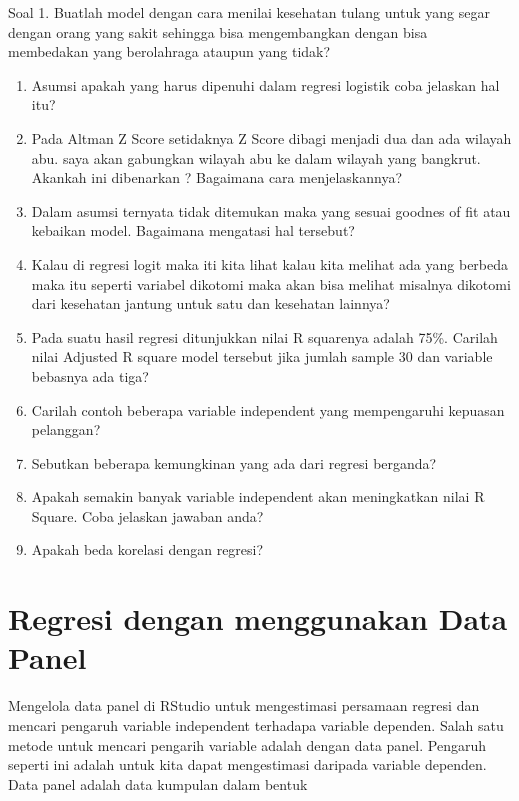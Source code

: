 \documentclass[
]{book}
\theoremstyle{definition}
\theoremstyle{definition}
\theoremstyle{definition}
\theoremstyle{definition}
\theoremstyle{remark}
\begin{document}
Soal
1. Buatlah model dengan cara menilai kesehatan tulang untuk yang segar dengan orang yang sakit sehingga bisa mengembangkan dengan bisa membedakan yang berolahraga ataupun yang tidak?

\begin{enumerate}
\def\labelenumi{\arabic{enumi}.}
\setcounter{enumi}{1}
\item
  Asumsi apakah yang harus dipenuhi dalam regresi logistik coba jelaskan hal itu?
\item
  Pada Altman Z Score setidaknya Z Score dibagi menjadi dua dan ada wilayah abu. saya akan gabungkan wilayah abu ke dalam wilayah yang bangkrut. Akankah ini dibenarkan ? Bagaimana cara menjelaskannya?
\item
  Dalam asumsi ternyata tidak ditemukan maka yang sesuai goodnes of fit atau kebaikan model. Bagaimana mengatasi hal tersebut?
\item
  Kalau di regresi logit maka iti kita lihat kalau kita melihat ada yang berbeda maka itu seperti variabel dikotomi maka akan bisa melihat misalnya dikotomi dari kesehatan jantung untuk satu dan kesehatan lainnya?
\item
  Pada suatu hasil regresi ditunjukkan nilai R squarenya adalah 75\%. Carilah nilai Adjusted R square model tersebut jika jumlah sample 30 dan variable bebasnya ada tiga?
\item
  Carilah contoh beberapa variable independent yang mempengaruhi kepuasan pelanggan?
\item
  Sebutkan beberapa kemungkinan yang ada dari regresi berganda?
\item
  Apakah semakin banyak variable independent akan meningkatkan nilai R Square. Coba jelaskan jawaban anda?
\item
  Apakah beda korelasi dengan regresi?
\end{enumerate}

\hypertarget{regresi-dengan-menggunakan-data-panel}{%
\section{Regresi dengan menggunakan Data Panel}\label{regresi-dengan-menggunakan-data-panel}}

Mengelola data panel di RStudio untuk mengestimasi persamaan regresi dan mencari pengaruh variable independent terhadapa variable dependen.
Salah satu metode untuk mencari pengarih variable adalah dengan data panel. Pengaruh seperti ini adalah untuk kita dapat mengestimasi daripada variable dependen. Data panel adalah data kumpulan dalam bentuk
\end{document}
